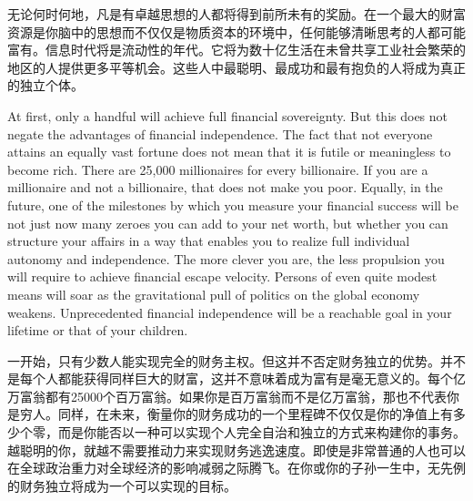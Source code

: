 \begin{Parallel}{97mm}{45mm}
  \ParallelRText
  {\small 无论何时何地，凡是有卓越思想的人都将得到前所未有的奖励。在一个最大的财富资源是你脑中的思想而不仅仅是物质资本的环境中，任何能够清晰思考的人都可能富有。信息时代将是流动性的年代。它将为数十亿生活在未曾共享工业社会繁荣的地区的人提供更多平等机会。这些人中最聪明、最成功和最有抱负的人将成为真正的独立个体。}


  \ParallelPar  

  \ParallelLText
  {At first, only a handful will achieve full financial sovereignty. But this does not negate the advantages of financial independence. The fact that not everyone attains an equally vast fortune does not mean that it is futile or meaningless to become rich. There are 25,000 millionaires for every billionaire. If you are a millionaire and not a billionaire, that does not make you poor. Equally, in the future, one of the milestones by which you measure your financial success will be not just now many zeroes you can add to your net worth, but whether you can structure your affairs in a way that enables you to realize full individual autonomy and independence. The more clever you are, the less propulsion you will require to achieve financial escape velocity. Persons of even quite modest means will soar as the gravitational pull of politics on the global economy weakens. Unprecedented financial independence will be a reachable goal in your lifetime or that of your children.  } 
 
 \ParallelRText
  {\small 一开始，只有少数人能实现完全的财务主权。但这并不否定财务独立的优势。并不是每个人都能获得同样巨大的财富，这并不意味着成为富有是毫无意义的。每个亿万富翁都有25000个百万富翁。如果你是百万富翁而不是亿万富翁，那也不代表你是穷人。同样，在未来，衡量你的财务成功的一个里程碑不仅仅是你的净值上有多少个零，而是你能否以一种可以实现个人完全自治和独立的方式来构建你的事务。越聪明的你，就越不需要推动力来实现财务逃逸速度。即使是非常普通的人也可以在全球政治重力对全球经济的影响减弱之际腾飞。在你或你的子孙一生中，无先例的财务独立将成为一个可以实现的目标。}

  \ParallelPar  


\end{Parallel}
